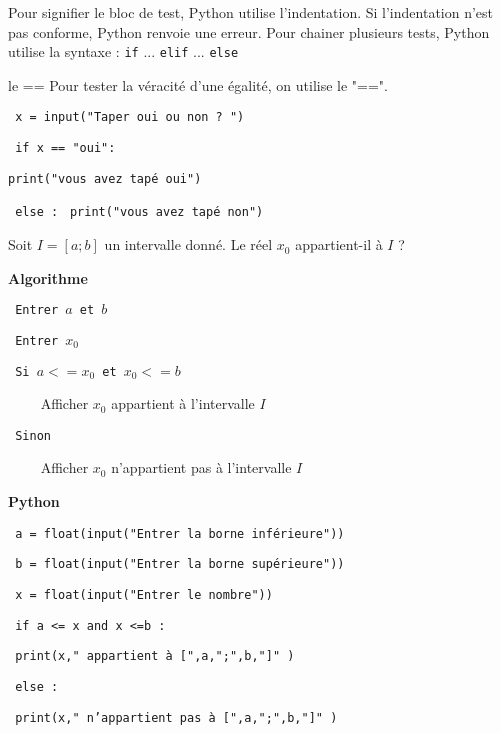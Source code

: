 \begin{Rq}
Pour signifier le bloc de test, Python utilise l'indentation. Si l'indentation n'est pas conforme, Python renvoie une erreur. 
Pour chainer plusieurs tests, Python utilise la syntaxe : \texttt{if} ...  \texttt{elif} ... \texttt{else}
\end{Rq}

\begin{minipage}{0.5\linewidth}
\begin{DefT}{le ==}
Pour tester la véracité d'une égalité, on utilise le "==". 
\end{DefT}
\end{minipage}
\begin{minipage}{0.5\linewidth}
\begin{Cod}
\texttt{ x = input("Taper oui ou non ? ")} 

\texttt{ if x == "oui":}

 \hspace{0.5cm} \texttt{print("vous avez tapé oui")}
  
\texttt{ else :}  \texttt{ print("vous avez tapé non") } 
\end{Cod}
\end{minipage}


\begin{ExC}{Soit $I=[a;b]$ un intervalle donné. Le réel $x_0$ appartient-il à $I$ ?}

 

\begin{minipage}{0.42\linewidth}

 
\textbf{Algorithme }

\texttt{ Entrer $a$ et $b$  } 

\texttt{ Entrer $x_0$  }

\texttt{ Si $a<= x_0 $ et $x_0 <= b$}

$ \quad \quad $  Afficher $x_0$ appartient à l'intervalle $I$ 

\texttt{ Sinon}

$ \quad \quad $   Afficher $x_0$ n'appartient pas à l'intervalle $I$ 
 
\end{minipage}
\begin{minipage}{0.7\linewidth}
 
\textbf{Python}

 
\texttt{ a = float(input("Entrer la borne inférieure"))}
 
\texttt{ b = float(input("Entrer la borne supérieure"))}
 
\texttt{ x = float(input("Entrer le nombre"))} 

\texttt{ if a <= x and x <=b :  } 

\hspace{0.4cm}	\texttt{ print(x," appartient à [",a,";",b,"]" ) } 

\texttt{ else :} 

\hspace{0.4cm}	\texttt{ print(x," n'appartient pas à [",a,";",b,"]" ) } 
\end{minipage}

\end{ExC}


